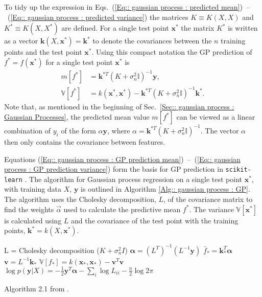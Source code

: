 \documentclass[twoside,english]{uiofysmaster}
\begin{document}
{{To tidy up the expression in Eqs.~(\ref{Eq:: gaussian process : predicted mean})~--~(\ref{Eq:: gaussian process : predicted variance}) the matrices $K \equiv K(X, X)$ and $K^* \equiv K(X, X^*)$ are defined. For a single test point $\textbf{x}^*$ the matrix $K^*$ is written as a vector $\textbf{k}(X, \textbf{x}^*) = \textbf{k}^*$ to denote the covariances between the $n$ training points and the test point $\textbf{x}^*$. Using this compact notation the GP prediction of $f^*=f(\textbf{x}^*)$ for a single test point $\textbf{x}^*$ is
\begin{align}
m[f^*] &= \textbf{k}^{*T}(K + \sigma_n^2\mathbb{I})^{-1} \textbf{y},\label{Eq:: gaussian process : GP prediction mean}\\
\mathbb{V}[f^*] &= k(\textbf{x}^*, \textbf{x}^*) - \textbf{k}^{*T}(K + \sigma_n^2 \mathbb{I})^{-1} \textbf{k}^*\label{Eq:: gaussian process : GP prediction variance}.
\end{align}
Note that, as mentioned in the beginning of Sec.~\ref{Sec:: gaussian process : Gaussian Processes}, the predicted mean value $m[f^*]$ can be viewed as a linear combination of $y_i$ of the form $\alpha \textbf{y}$, where $\alpha = \textbf{k}^{*T}(K + \sigma_n^2\mathbb{I})^{-1}$. The vector $\alpha$ then only contains the covariance between features.

Equations (\ref{Eq:: gaussian process : GP prediction mean})~--~(\ref{Eq:: gaussian process : GP prediction variance}) form the basis for GP prediction in \verb|scikit-learn|  \cite{scikit-learn}. The algorithm for Gaussian process regression on a single test point $\textbf{x}^*$, with training data $X$, $\textbf{y}$ is outlined in Algorithm \ref{Alg:: gaussian process : GP}. The algorithm uses the Cholesky decomposition, $L$, of the covariance matrix to find the weights $\vec{\alpha}$ used to calculate the predictive mean $f^*$. The variance $\mathbb{V}[\textbf{x}^*]$ is calculated using $L$ and the covariance of the test point with the training points, $\textbf{k}^* = k(X, \textbf{x}^*)$.

\begin{algorithm}
L = Cholesky decomposition ($K + \sigma_n^2 I$) \;
$\boldsymbol{\alpha} = (L^T)^{-1}(L^{-1} \textbf{y})$ \;
$\bar{f}_* = \textbf{k}_*^T \boldsymbol{\alpha}$ \;
$\textbf{v} = L^{-1} \textbf{k}_*$ \;
$\mathbb{V}[f_*] = k(\textbf{x}_*, \textbf{x}_*) - \textbf{v}^T \textbf{v}$ \;
$\log p(\textbf{y}|X) = - \frac{1}{2} \textbf{y}^T \boldsymbol{\alpha} - \sum_i \log L_{ii} - \frac{n}{2} \log 2 \pi$ \;
\caption{Algorithm 2.1 from \cite{rasmussen2006gaussian}.}
\label{Alg:: gaussian process : GP}
\end{algorithm}




}}
\end{document}
